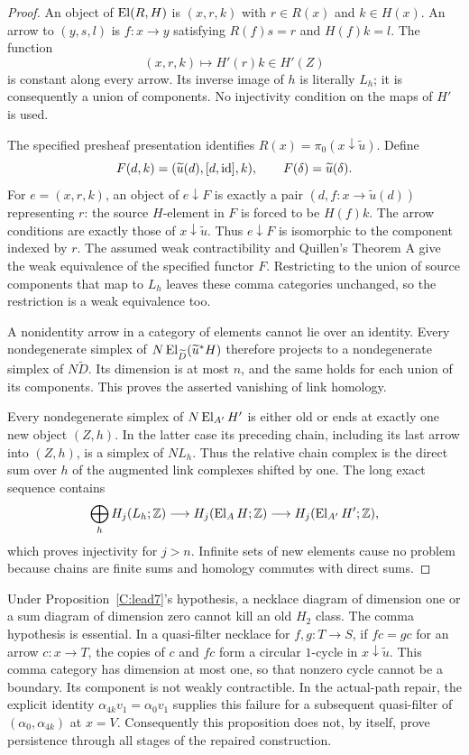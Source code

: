 \begin{proof}
An object of $\operatorname{El}(R,H)$ is $(x,r,k)$ with $r\in R(x)$ and
$k\in H(x)$. An arrow to $(y,s,l)$ is $f:x\to y$ satisfying
$R(f)s=r$ and $H(f)k=l$. The function
\[
 (x,r,k)\longmapsto H'(r)k\in H'(Z)
\]
is constant along every arrow. Its inverse image of $h$ is
literally $L_h$; it is consequently a union of components.
No injectivity condition on the maps of $H'$ is used.

The specified presheaf presentation identifies
$R(x)=\pi_0(x\downarrow\widetilde u)$. Define
\[
 F(d,k)=(\widetilde u(d),[d,\operatorname{id}],k),\qquad
 F(\delta)=\widetilde u(\delta).
\]
For $e=(x,r,k)$, an object of $e\downarrow F$ is exactly a pair
$(d,f:x\to\widetilde u(d))$ representing $r$: the source
$H$-element in $F$ is forced to be $H(f)k$. The arrow conditions
are exactly those of $x\downarrow\widetilde u$. Thus
$e\downarrow F$ is isomorphic to the component indexed by $r$.
The assumed weak contractibility and Quillen's Theorem A give the
weak equivalence of the specified functor $F$. Restricting to the
union of source components that map to $L_h$ leaves these comma
categories unchanged, so the restriction is a weak equivalence too.

A nonidentity arrow in a category of elements cannot lie over an
identity. Every nondegenerate simplex of
$N\operatorname{El}_{\widetilde D}(\widetilde u^*H)$ therefore projects to a
nondegenerate simplex of $N\widetilde D$. Its dimension is at
most $n$, and the same holds for each union of its components.
This proves the asserted vanishing of link homology.

Every nondegenerate simplex of $N\operatorname{El}_{A'}H'$ is either old or
ends at exactly one new object $(Z,h)$. In the latter case its
preceding chain, including its last arrow into $(Z,h)$, is a
simplex of $NL_h$. Thus the relative chain complex is the direct
sum over $h$ of the augmented link complexes shifted by one.
The long exact sequence contains
\[
 \bigoplus_h H_j(L_h;\mathbb Z)\longrightarrow H_j(\operatorname{El}_AH;\mathbb Z)
 \longrightarrow H_j(\operatorname{El}_{A'}H';\mathbb Z),
\]
which proves injectivity for $j>n$. Infinite sets of new elements
cause no problem because chains are finite sums and homology
commutes with direct sums.
\end{proof}

\begin{remark}
\label{C:lead7-limitation}
Under Proposition~\ref{C:lead7}'s hypothesis, a necklace diagram
of dimension one or a sum diagram of dimension zero cannot kill
an old $H_2$ class. The comma hypothesis is essential. In a
quasi-filter necklace for $f,g:T\to S$, if $fc=gc$ for an arrow
$c:x\to T$, the copies of $c$ and $fc$ form a circular
$1$-cycle in $x\downarrow\widetilde u$. This comma category
has dimension at most one, so that nonzero cycle cannot be a
boundary. Its component is not weakly contractible. In the
actual-path repair, the explicit identity
$\alpha_{4k}v_1=\alpha_0v_1$ supplies this failure for a subsequent
quasi-filter of $(\alpha_0,\alpha_{4k})$ at $x=V$. Consequently
this proposition does not, by itself, prove persistence through
all stages of the repaired construction.
\end{remark}

